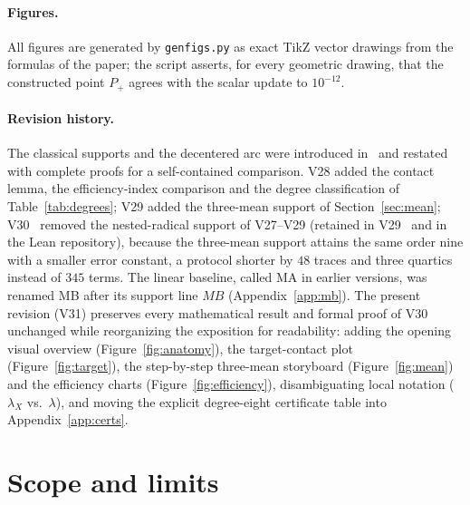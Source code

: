 \paragraph{Figures.}
All figures are generated by \texttt{genfigs.py} as exact TikZ vector drawings from the formulas of the
paper; the script asserts, for every geometric drawing, that the constructed point $P_+$ agrees with the
scalar update to $10^{-12}$.

\paragraph{Revision history.}
The classical supports and the decentered arc were introduced in~\cite{v20} and restated with complete
proofs for a self-contained comparison. V28 added the contact lemma, the efficiency-index comparison and
the degree classification of Table~\ref{tab:degrees}; V29 added the three-mean support of
Section~\ref{sec:mean}; V30~\cite{v30} removed the nested-radical support of V27--V29 (retained in
V29~\cite{v29} and in the Lean repository), because the three-mean support attains the same order nine
with a smaller error constant, a protocol shorter by $48$ traces and three quartics instead of $345$
terms. The linear baseline, called MA in earlier versions, was renamed MB after its support line $MB$
(Appendix~\ref{app:mb}). The present revision (V31) preserves every mathematical result and formal proof
of V30 unchanged while reorganizing the exposition for readability: adding the opening visual overview
(Figure~\ref{fig:anatomy}), the target-contact plot (Figure~\ref{fig:target}), the step-by-step
three-mean storyboard (Figure~\ref{fig:mean}) and the efficiency charts (Figure~\ref{fig:efficiency}),
disambiguating local notation ($\lambda_X$ vs.\ $\lambda$), and moving the explicit degree-eight
certificate table into Appendix~\ref{app:certs}.

\section{Scope and limits}\label{sec:limits}

